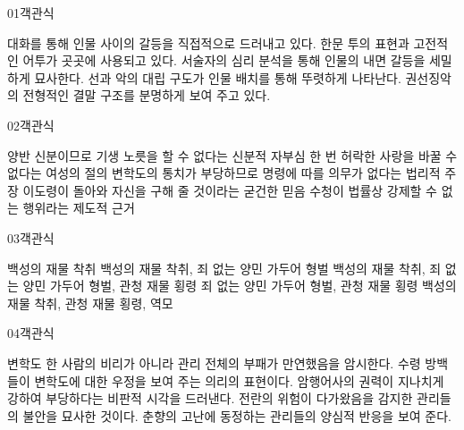\documentclass[fs85,seriesWit]{korfarm-base}
\begin{document}
\kfBeginMC
\begin{kfQBlock}{01}{객관식}
\begin{kfChoices}
\kfChoice 대화를 통해 인물 사이의 갈등을 직접적으로 드러내고 있다.
\kfChoice 한문 투의 표현과 고전적인 어투가 곳곳에 사용되고 있다.
\kfChoice 서술자의 심리 분석을 통해 인물의 내면 갈등을 세밀하게 묘사한다.
\kfChoice 선과 악의 대립 구도가 인물 배치를 통해 뚜렷하게 나타난다.
\kfChoice 권선징악의 전형적인 결말 구조를 분명하게 보여 주고 있다.
\end{kfChoices}
\end{kfQBlock}

\begin{kfQBlock}{02}{객관식}
\begin{kfChoices}
\kfChoice 양반 신분이므로 기생 노릇을 할 수 없다는 신분적 자부심
\kfChoice 한 번 허락한 사랑을 바꿀 수 없다는 여성의 절의
\kfChoice 변학도의 통치가 부당하므로 명령에 따를 의무가 없다는 법리적 주장
\kfChoice 이도령이 돌아와 자신을 구해 줄 것이라는 굳건한 믿음
\kfChoice 수청이 법률상 강제할 수 없는 행위라는 제도적 근거
\end{kfChoices}
\end{kfQBlock}

\begin{kfQBlock}{03}{객관식}
\begin{kfChoices}
\kfChoice 백성의 재물 착취
\kfChoice 백성의 재물 착취, 죄 없는 양민 가두어 형벌
\kfChoice 백성의 재물 착취, 죄 없는 양민 가두어 형벌, 관청 재물 횡령
\kfChoice 죄 없는 양민 가두어 형벌, 관청 재물 횡령
\kfChoice 백성의 재물 착취, 관청 재물 횡령, 역모
\end{kfChoices}
\end{kfQBlock}

\begin{kfQBlock}{04}{객관식}
\begin{kfChoices}
\kfChoice 변학도 한 사람의 비리가 아니라 관리 전체의 부패가 만연했음을 암시한다.
\kfChoice 수령 방백들이 변학도에 대한 우정을 보여 주는 의리의 표현이다.
\kfChoice 암행어사의 권력이 지나치게 강하여 부당하다는 비판적 시각을 드러낸다.
\kfChoice 전란의 위험이 다가왔음을 감지한 관리들의 불안을 묘사한 것이다.
\kfChoice 춘향의 고난에 동정하는 관리들의 양심적 반응을 보여 준다.
\end{kfChoices}
\end{kfQBlock}
\end{document}
